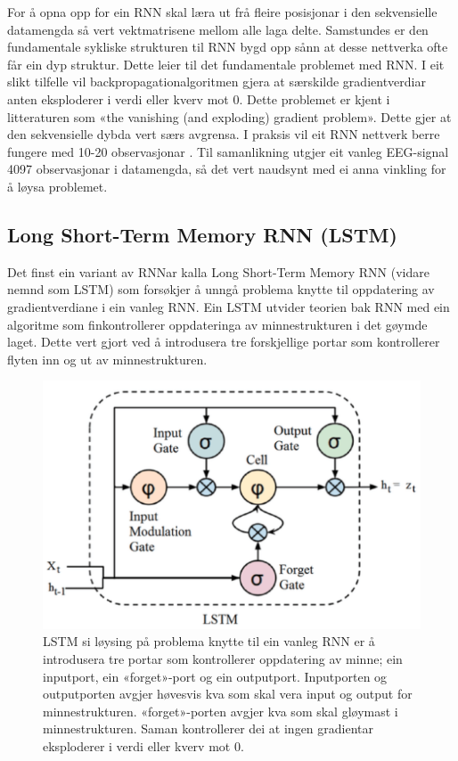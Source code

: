 \documentclass[oneside, nynorsk]{book}
\begin{document}
For å opna opp for ein RNN skal læra ut frå fleire posisjonar i den sekvensielle datamengda så vert vektmatrisene mellom alle laga delte.
Samstundes er den fundamentale sykliske strukturen til RNN bygd opp sånn at desse nettverka ofte får ein dyp struktur.
Dette leier til det fundamentale problemet med RNN. I eit slikt tilfelle vil backpropagationalgoritmen gjera at særskilde gradientverdiar
anten eksploderer i verdi eller kverv mot 0. Dette problemet er kjent i litteraturen som «the vanishing (and exploding) gradient problem».
Dette gjer at den sekvensielle dybda vert særs avgrensa. I praksis vil eit RNN nettverk berre fungere med 10-20 observasjonar \cite{Goodfellow-et-al-2016}.
Til samanlikning utgjer eit vanleg EEG-signal 4097 observasjonar i datamengda, så det vert naudsynt med ei anna vinkling for å løysa problemet.
\subsection{Long Short-Term Memory RNN (LSTM)}
Det finst ein variant av RNNar kalla Long Short-Term Memory RNN (vidare nemnd som LSTM) som forsøkjer å unngå problema knytte
til oppdatering av gradientverdiane i ein vanleg RNN. Ein LSTM utvider teorien bak RNN med ein algoritme som finkontrollerer
oppdateringa av minnestrukturen i det gøymde laget. Dette vert gjort ved å introdusera tre forskjellige portar som kontrollerer flyten
inn og ut av minnestrukturen.

\begin{figure}[h!]
    \centering
    \centerline{\includegraphics[width=1\linewidth]{LSTMcell}}
    \caption{LSTM si løysing på problema knytte til ein vanleg RNN er å introdusera tre portar som kontrollerer oppdatering av minne; ein inputport, ein «forget»-port og ein outputport. Inputporten og outputporten avgjer høvesvis kva
    som skal vera input og output for minnestrukturen. «forget»-porten avgjer kva som skal gløymast i minnestrukturen. Saman kontrollerer dei at
    ingen gradientar eksploderer i verdi eller kverv mot 0.}
    \label{LSTMcell}
\end{figure}
\end{document}
